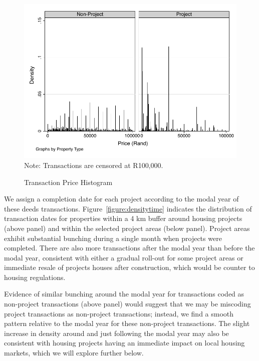 \documentclass[12pt]{article}
\begin{document}
\begin{figure}
\caption{Transaction Price Histogram}\label{figure:transactionhist}
\centering
\includegraphics[scale=1]{figures/price_histogram.pdf}\\
\footnotesize{Note: Transactions are censored at R100,000.}
\end{figure}

We assign a completion date for each project according to the modal year of these deeds transactions.  Figure~\ref{figure:densitytime} indicates the distribution of transaction dates for properties within a 4 km buffer around housing projects (above panel) and within the selected project areas (below panel).  Project areas exhibit substantial bunching during a single month when projects were completed.  There are also more transactions after the modal year than before the modal year, consistent with either a gradual roll-out for some project areas or immediate resale of projects houses after construction, which would be counter to housing regulations.  


Evidence of similar bunching around the modal year for transactions coded as non-project transactions (above panel) would suggest that we may be miscoding project transactions as non-project transactions; instead, we find a smooth pattern relative to the modal year for these non-project transactions.  The slight increase in density around and just following the modal year may also be consistent with housing projects having an immediate impact on local housing markets, which we will explore further below.
\end{document}
